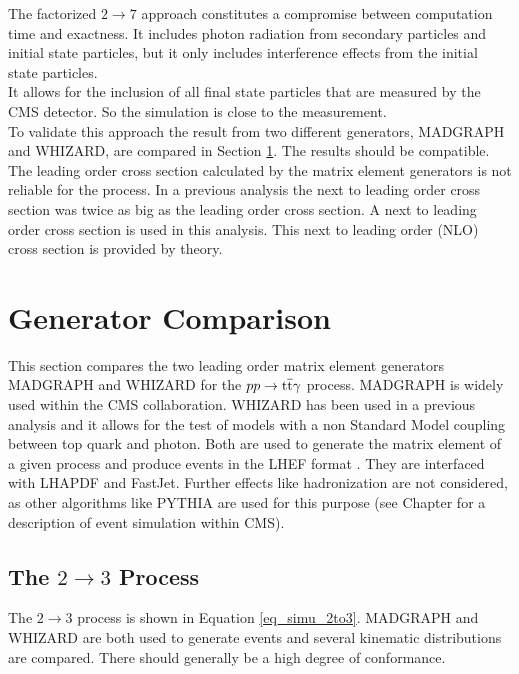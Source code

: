 The factorized $2 \to 7$ approach constitutes a compromise between computation time and exactness. It includes photon radiation from secondary particles and initial state particles, but it only includes interference effects from the initial state particles. \\
It allows for the inclusion of all final state particles that are measured by the CMS detector. So the simulation is close to the measurement.\\
To validate this approach the result from two different generators, MADGRAPH and WHIZARD, are compared in Section \ref{ch_simu_comp}. The results should be compatible. \\
The leading order cross section calculated by the matrix element generators is not reliable for the \ttgamma process. In a previous analysis the next to leading order cross section was twice as big as the leading order cross section. A next to leading order cross section is used in this analysis. This next to leading order (NLO) cross section is provided by theory. \\ 

\section{Generator Comparison}
\label{ch_simu_comp}

This section compares the two leading order matrix element generators MADGRAPH and WHIZARD for the $pp \to \mathrm{t}\overline{\mathrm{t}} \gamma$ process. MADGRAPH is widely used within the CMS collaboration. WHIZARD has been used in a previous \ttgamma analysis \cite{CMS-PAS-TOP-13-011} and it allows for the test of models with a non Standard Model coupling between top quark and photon. Both are used to generate the matrix element of a given process and produce events in the LHEF format \cite{Alwall:2006yp}. They are interfaced with LHAPDF \cite{Whalley:2005nh} and FastJet\cite{Cacciari:2011ma}. Further effects like hadronization are not considered, as other algorithms like PYTHIA are used for this purpose (see Chapter  for a description of event simulation within CMS).

\subsection{The $2 \to 3$ Process}

The $2 \to 3$ process is shown in Equation \ref{eq_simu_2to3}. MADGRAPH and WHIZARD are both used to generate events and several kinematic distributions are compared. There should generally be a high degree of conformance.

